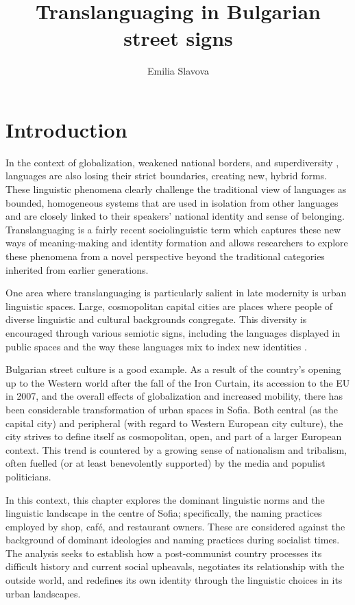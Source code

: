 \documentclass[output=paper]{langscibook}
\title{Translanguaging in Bulgarian street signs}
\author{Emilia Slavova \orcid{0000-0003-3993-4604} \affiliation{St. Kliment Ohridski University of Sofia}}
\begin{document}
\maketitle

\section{Introduction}
In the context of globalization, weakened national borders, and superdiversity \citep{Blommaert.2011}, languages are also losing their strict boundaries, creating new, hybrid forms. These linguistic phenomena clearly challenge the traditional view of languages as bounded, homogeneous systems that are used in isolation from other languages and are closely linked to their speakers’ national identity and sense of belonging. Translanguaging is a fairly recent sociolinguistic term which captures these new ways of meaning-making and identity formation and allows researchers to explore these phenomena from a novel perspective beyond the traditional categories inherited from earlier generations. 

One area where translanguaging is particularly salient in late modernity is urban linguistic spaces. Large, cosmopolitan capital cities are places where people of diverse linguistic and cultural backgrounds congregate. This diversity is encouraged through various semiotic signs, including the languages displayed in public spaces and the way these languages mix to index new identities \citep{Blommaert.2010,BlommaertMaly.2014,Gorter.2013}.  %


Bulgarian street culture is a good example. As a result of the country's opening up to the Western world after the fall of the Iron Curtain, its accession to the EU in 2007, and the overall effects of globalization and increased mobility, there has been considerable transformation of urban spaces in Sofia. Both central (as the capital city) and peripheral (with regard to Western European city culture), the city strives to define itself as cosmopolitan, open, and part of a larger European context. This trend is countered by a growing sense of nationalism and tribalism, often fuelled (or at least benevolently supported) by the media and populist politicians. 

In this context, this chapter explores the dominant linguistic norms and the linguistic landscape in the centre of Sofia; specifically, the naming practices employed by shop, café, and restaurant owners. These are considered against the background of dominant ideologies and naming practices during socialist times. The analysis seeks to establish how a post-communist country processes its difficult history and current social upheavals, negotiates its relationship with the outside world, and redefines its own identity through the linguistic choices in its urban landscapes. 
\end{document}
